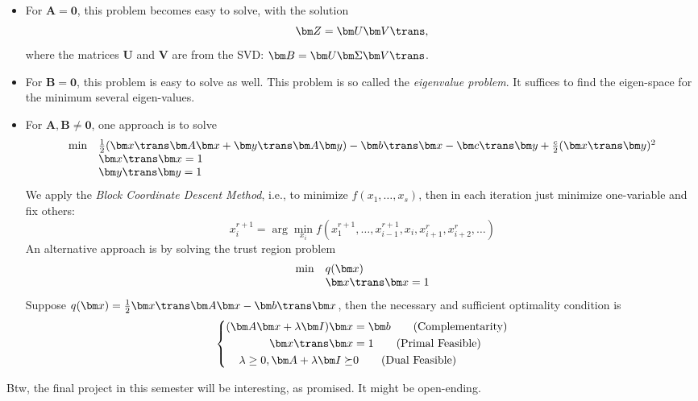 \begin{itemize}
\item
For $\bm A=\bm0$, this problem becomes easy to solve, with the solution 
\[
\bm Z=\bm U\bm V\trans,
\]
where the matrices $\bm U$ and $\bm V$ are from the SVD: $\bm B=\bm U\bm\Sigma\bm V\trans$.
\item
For $\bm B=\bm0$, this problem is easy to solve as well. This problem is so called the \emph{eigenvalue problem}. It suffices to find the eigen-space for the minimum several eigen-values.
\item
For $\bm A,\bm B\ne\bm0$, one approach is to solve
\[
\begin{array}{ll}
\min&\frac{1}{2}(\bm x\trans\bm A\bm x+\bm y\trans\bm A\bm y) - \bm b\trans\bm x-\bm c\trans\bm y+\frac{c}{2}(\bm x\trans\bm y)^2\\
&\bm x\trans\bm x=1\\
&\bm y\trans\bm y=1
\end{array}
\]
We apply the \emph{Block Coordinate Descent Method}, i.e., to minimize $f(x_1,\dots,x_s)$, then in each iteration just minimize one-variable and fix others:
\[
x_i^{r+1}=\arg\min_{x_i}f(x_1^{r+1},\dots,x^{r+1}_{i-1},x_i,x_{i+1}^r,x_{i+2}^r,\dots)
\]
An alternative approach is by solving the trust region problem
\[
\begin{array}{ll}
\min&q(\bm x)\\
&\bm x\trans\bm x=1
\end{array}
\]
Suppose $q(\bm x)=\frac{1}{2}\bm x\trans\bm A\bm x-\bm b\trans\bm x$, then the necessary and sufficient optimality condition is
\[
\left\{
\begin{aligned}
(\bm A\bm x+\lambda\bm I)\bm x&=\bm b\qquad (\mbox{Complementarity})\\
\bm x\trans\bm x&=1\qquad(\mbox{Primal Feasible})\\
\lambda\ge0,\bm A+\lambda\bm I\succeq&0\qquad(\mbox{Dual Feasible})
\end{aligned}
\right.
\]
\end{itemize}
Btw, the final project in this semester will be interesting, as promised. It might be open-ending.

